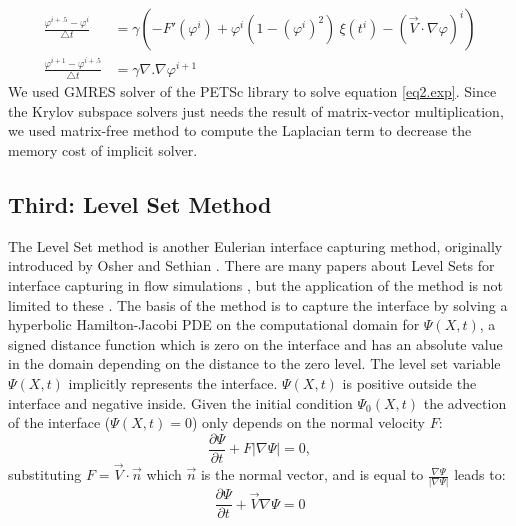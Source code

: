 \documentclass[review]{elsarticle}
\begin{document}
\begin{align}
\frac{\varphi^{i+.5}-\varphi^i}{\bigtriangleup t}&= \gamma (-F'(\varphi^i)+\varphi^i (1-(\varphi^i)^2)\ \xi(t^i)-(\overrightarrow{V}\cdot \nabla \varphi)^i) \label{eq1.exp}\\
\frac{\varphi^{i+1}-\varphi^{i+.5}}{\bigtriangleup t} &= \gamma \nabla .\nabla \varphi^{i+1} \label{eq2.exp}
\end{align}
We used GMRES solver of the PETSc \cite{petsc-user-ref} library to solve equation \eqref{eq2.exp}. Since the Krylov subspace solvers just needs the result of matrix-vector multiplication, we used matrix-free method to compute the Laplacian term to decrease the memory cost of implicit solver.


\subsection{Third: Level Set Method} \label{level set}
The Level Set method is another Eulerian interface capturing method, originally introduced by Osher and Sethian  \cite{Osher1988}. There are many papers about Level Sets for  interface capturing in flow simulations \citep{Kees2011,Losasso2006,Sethian2003}, but the application of the method is not limited to these \citep{Li2011b,Lie2006}.
The basis of the method is to capture the interface by   solving a hyperbolic Hamilton-Jacobi PDE on 
the computational domain for $\varPsi (X,t)$, a signed distance function which  is zero on the interface and has an absolute value in the domain depending on the distance to the zero level.  The level set variable $\varPsi (X,t)$ implicitly represents the interface. 
 $\varPsi (X,t)$ is  positive outside  the interface and  negative inside. 
Given the initial condition $\varPsi_0 (X,t)$ the advection of the interface ($\varPsi (X,t)=0$) only depends on the normal velocity $F$:
\begin{equation}\label{levelseteq1}
        \frac{\partial \varPsi}{\partial t} + F |\nabla \varPsi| = 0,
\end{equation}
substituting $F = \overrightarrow{V} \cdot \overrightarrow{n} $ which  $\overrightarrow{n} $ is the normal vector, and is equal to
$ \frac{\nabla \varPsi}{|\nabla \varPsi|}$ leads to:
\begin{equation}\label{levelseteq2}
        \frac{\partial \varPsi}{\partial t} + \overrightarrow{V} \nabla \varPsi = 0
\end{equation}
\end{document}
